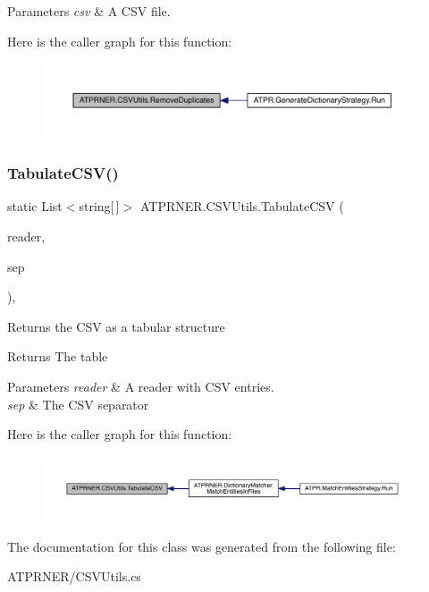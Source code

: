 \begin{DoxyParams}{Parameters}
{\em csv} & A C\+SV file.\\
\hline
\end{DoxyParams}
Here is the caller graph for this function\+:
\nopagebreak
\begin{figure}[H]
\begin{center}
\leavevmode
\includegraphics[width=350pt]{d7/d1f/class_a_t_p_r_n_e_r_1_1_c_s_v_utils_ab236c362e83053e0e7165aa2e45849c4_icgraph}
\end{center}
\end{figure}
\hypertarget{class_a_t_p_r_n_e_r_1_1_c_s_v_utils_addabfb59d0e9755c0336b2de6b0bc9a4}{}\label{class_a_t_p_r_n_e_r_1_1_c_s_v_utils_addabfb59d0e9755c0336b2de6b0bc9a4} 
\subsubsection{\texorpdfstring{Tabulate\+C\+S\+V()}{TabulateCSV()}}
{\footnotesize\ttfamily static List$<$string\mbox{[}$\,$\mbox{]}$>$ A\+T\+P\+R\+N\+E\+R.\+C\+S\+V\+Utils.\+Tabulate\+C\+SV (\begin{DoxyParamCaption}\item[{Text\+Reader}]{reader,  }\item[{char}]{sep }\end{DoxyParamCaption})\hspace{0.3cm}{\ttfamily [inline]}, {\ttfamily [static]}}



Returns the C\+SV as a tabular structure 

\begin{DoxyReturn}{Returns}
The table
\end{DoxyReturn}

\begin{DoxyParams}{Parameters}
{\em reader} & A reader with C\+SV entries.\\
\hline
{\em sep} & The C\+SV separator\\
\hline
\end{DoxyParams}
Here is the caller graph for this function\+:
\nopagebreak
\begin{figure}[H]
\begin{center}
\leavevmode
\includegraphics[width=350pt]{d7/d1f/class_a_t_p_r_n_e_r_1_1_c_s_v_utils_addabfb59d0e9755c0336b2de6b0bc9a4_icgraph}
\end{center}
\end{figure}


The documentation for this class was generated from the following file\+:\begin{DoxyCompactItemize}
\item 
A\+T\+P\+R\+N\+E\+R/C\+S\+V\+Utils.\+cs\end{DoxyCompactItemize}

